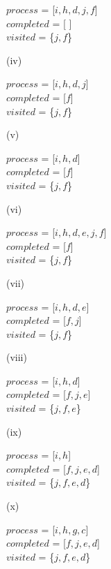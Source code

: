 \documentclass[addpoints]{exam}
\begin{document}
\begin{questions}
\begin{parts}
\begin{solution}
\begin{center}
    		$process$ = [$i, h, d, j, f$]\\
    		$completed$ = [ ]\\
    		$visited$ = \{$j, f$\}\\
    	\end{center}
    	(iv)
    	\begin{center}
    		$process$ = [$i, h, d, j$]\\
    		$completed$ = [$f$]\\
    		$visited$ = \{$j, f$\}\\
    	\end{center}
    	(v)
    	\begin{center}
    		$process$ = [$i, h, d$]\\
    		$completed$ = [$f$]\\
    		$visited$ = \{$j, f$\}\\
    	\end{center}
    	(vi)
    	\begin{center}
    		$process$ = [$i, h, d, e, j, f$]\\
    		$completed$ = [$f$]\\
    		$visited$ = \{$j, f$\}\\
    	\end{center}
    	(vii)
    	\begin{center}
    		$process$ = [$i, h, d, e$]\\
    		$completed$ = [$f, j$]\\
    		$visited$ = \{$j, f$\}\\
    	\end{center}
    	(viii)
    	\begin{center}
    		$process$ = [$i, h, d$]\\
    		$completed$ = [$f, j, e$]\\
    		$visited$ = \{$j, f, e$\}\\
    	\end{center}
    	(ix)
    	\begin{center}
    		$process$ = [$i, h$]\\
    		$completed$ = [$f, j, e, d$]\\
    		$visited$ = \{$j, f, e, d$\}\\
    	\end{center}
    	(x)
    	\begin{center}
    		$process$ = [$i, h, g, c$]\\
    		$completed$ = [$f, j, e, d$]\\
    		$visited$ = \{$j, f, e, d$\}\\

\end{center}
\end{solution}
\end{parts}
\end{questions}
\end{document}
